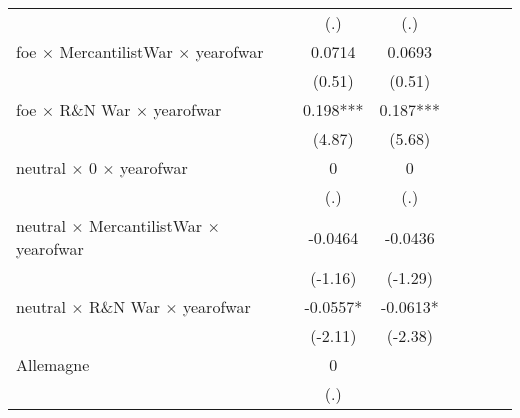 {\begin{tabular}{l*{6}{c}}
                    &         (.)         &         (.)         &                     &                     &                     &                     \\
[1em]
foe $\times$ MercantilistWar $\times$ yearofwar&      0.0714         &      0.0693         &                     &                     &                     &                     \\
                    &      (0.51)         &      (0.51)         &                     &                     &                     &                     \\
[1em]
foe $\times$ R\&N War $\times$ yearofwar&       0.198***&       0.187***&                     &                     &                     &                     \\
                    &      (4.87)         &      (5.68)         &                     &                     &                     &                     \\
[1em]
neutral $\times$ 0 $\times$ yearofwar&           0         &           0         &                     &                     &                     &                     \\
                    &         (.)         &         (.)         &                     &                     &                     &                     \\
[1em]
neutral $\times$ MercantilistWar $\times$ yearofwar&     -0.0464         &     -0.0436         &                     &                     &                     &                     \\
                    &     (-1.16)         &     (-1.29)         &                     &                     &                     &                     \\
[1em]
neutral $\times$ R\&N War $\times$ yearofwar&     -0.0557*  &     -0.0613*  &                     &                     &                     &                     \\
                    &     (-2.11)         &     (-2.38)         &                     &                     &                     &                     \\
[1em]
Allemagne           &           0         &                     &                     &                     &                     &                     \\
                    &         (.)         &                     &                     &                     &                     &                     \\

\end{tabular}}
